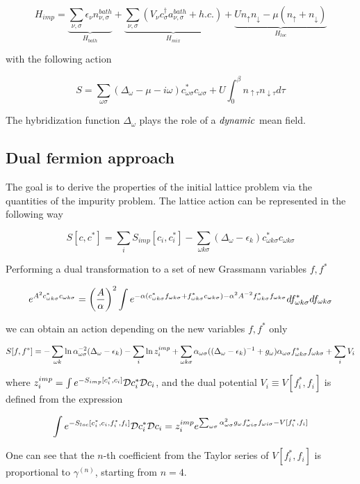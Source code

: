 \[ H_{imp} = \underbrace{\sum_{\nu,\sigma}\epsilon_\nu n_{\nu,\sigma}^{bath}}_{H_{bath}} + 
	     \underbrace{\sum_{\nu,\sigma}\left(V_{\nu}c_{\sigma}^{\dagger}a_{\nu,\sigma}^{bath}+h.c.\right)}_{H_{mix}}+
	     \underbrace{U n_{\uparrow} n_{\downarrow}-\mu \left(n_{\uparrow}+n_{\downarrow}\right)}_{H_{loc}}
\]

with the following action

\[ S = \sum_{\omega \sigma}(\Delta_\omega-\mu-i\omega)c_{\omega\sigma}^* c_{\omega\sigma} + U\int_0^\beta n_{\uparrow\tau}n_{\downarrow\tau} d\tau \]

The hybridization function $\Delta_\omega$ plays the role of a $\it{dynamic}$ mean field.

\subsection{Dual fermion approach}
The goal is to derive the properties of the initial lattice problem via the quantities
of the impurity problem.
The lattice action can be represented in the following way

\[ S[c,c^*] = \sum_i S_{imp}[c_i,c_i^*] - \sum_{\omega k \sigma}(\Delta_\omega-\epsilon_k)c_{\omega k\sigma}^* c_{\omega k\sigma} \]

Performing a dual transformation to a set of new Grassmann variables $f,f^*$

\[ e^{A^2 c_{\omega k\sigma}^*c_{\omega k\sigma}} = \left(\frac{A}{\alpha}\right)^2 \int 
    e^{-\alpha(c_{\omega k\sigma}^*f_{\omega k\sigma}+f_{\omega k\sigma}^*c_{\omega k\sigma})-\alpha^2 A^{-2}f_{\omega k\sigma}^*f_{\omega k\sigma}}df_{\omega k\sigma}^*df_{\omega k\sigma}
 \]

we can obtain an action depending on the new variables $f,f^*$ only

\[ S[f,f^*] = -\sum_{\omega k} \ln{\alpha_{\omega\sigma}^{-2}(\Delta_\omega-\epsilon_k)} 
    - \sum_i\ln{z_i^{imp}} + \sum_{\omega k\sigma} \alpha_{\omega\sigma}((\Delta_\omega-\epsilon_k)^{-1}+g_\omega)
    \alpha_{\omega\sigma}f_{\omega k\sigma}^*f_{\omega k\sigma}+\sum_i V_i \]

where $z_i^{imp} = \int e^{-S_{imp}[c_i^*,c_i]}\mathcal{D} c_i^*\mathcal{D} c_i$, and the dual potential $V_i \equiv V[f_i^*,f_i]$
is defined from the expression

\[ \int e^{-S_{loc}[c_i^*,c_i,f_i^*,f_i]}\mathcal{D} c_i^*\mathcal{D} c_i = 
  z_i^{imp}e^{\sum_{\omega\sigma}\alpha_{\omega\sigma}^2g_\omega f_{\omega i \sigma}^*f_{\omega i \sigma} - V[f_i^*,f_i]} \]

One can see that the $n$-th coefficient from the Taylor series of 
$V[f_i^*,f_i]$ is proportional to $\gamma^{(n)}$, starting from $n=4$.